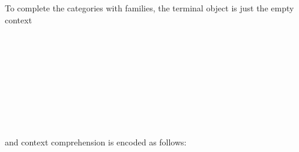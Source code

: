 To complete the categories with families, the terminal object is just the empty context
\begin{code}
%
\\
\> \AgdaSymbol{:} \<%
\\
\> \<[4]%
\>[4]\AgdaSymbol{=}  \AgdaSymbol{\{}\<%
\\
\>[0]\<[6]%
\>[6] \AgdaSymbol{=} \AgdaSymbol{;}\<%
\\
\>[0]\<[6]%
\>[6] \<[14]%
\>[14]\AgdaSymbol{=}  \AgdaBound{\_} \AgdaBound{\_}  \AgdaSymbol{;}\<%
\\
\>[0]\<[6]%
\>[6] \<[14]%
\>[14]\AgdaSymbol{=} \AgdaSymbol{;}\<%
\\
\>[0]\<[6]%
\>[6] \<[14]%
\>[14]\AgdaSymbol{=}  \AgdaBound{\_}  \AgdaSymbol{;}\<%
\\
\>[0]\<[6]%
\>[6] \<[14]%
\>[14]\AgdaSymbol{=}  \AgdaBound{\_} \AgdaBound{\_}   \AgdaSymbol{\}}\<%
\\
\end{code}

and context comprehension is encoded as follows:

